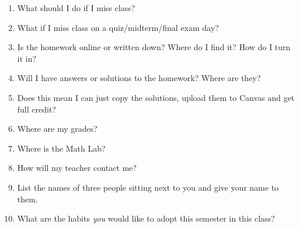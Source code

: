 \documentclass[11pt,fleqn]{article}
\begin{document}
\begin{enumerate}
\item What should I do if I miss class?
\vfill

\item What if I miss class on a quiz/midterm/final exam day?
\vfill
\newpage
\item Is the homework online or written down? Where do I find it? How do I turn it in?
\vfill
\item Will I have answers or solutions to the homework? Where are they?\\
\vfill
\item Does this mean I can just copy the solutions, upload them to Canvas and get full credit? \\
\vfill
\item Where are my grades?\\
\vfill

\item Where is the Math Lab?\\
\vfill
\item How will my teacher contact me? \\
\vfill
\item List the names of three people sitting next to you and give your name to them.
\vfill
\item What are the habits \emph{you} would like to adopt this semester in this class?
\vfill
\end{enumerate}
\end{document}
